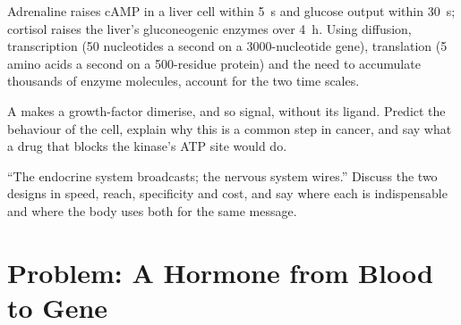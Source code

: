 \begin{exercise}[$\star\star\star$]\label{exo:b2:cell-signalling:10}
Adrenaline raises cAMP in a liver cell within \qty{5}{s} and glucose
output within \qty{30}{s}; cortisol raises the liver's gluconeogenic
enzymes over \qty{4}{h}. Using diffusion, transcription (\qty{50}{}
nucleotides a second on a \qty{3000}{}-nucleotide gene), translation
(\qty{5}{} amino acids a second on a \num{500}-residue protein) and
the need to accumulate thousands of enzyme molecules, account for
the two time scales.
\end{exercise}

\begin{exercise}[$\star\star\star$]\label{exo:b2:cell-signalling:11}
A  makes a growth-factor 
dimerise, and so signal, without its ligand. Predict the behaviour
of the cell, explain why this is a common step in cancer, and say
what a drug that blocks the kinase's ATP site would do.
\end{exercise}

\begin{exercise}[$\star\star\star$]\label{exo:b2:cell-signalling:12}
``The endocrine system broadcasts; the nervous system wires.''
Discuss the two designs in speed, reach, specificity and cost, and
say where each is indispensable and where the body uses both for
the same message.
\end{exercise}

\section{Problem: A Hormone from Blood to Gene}

